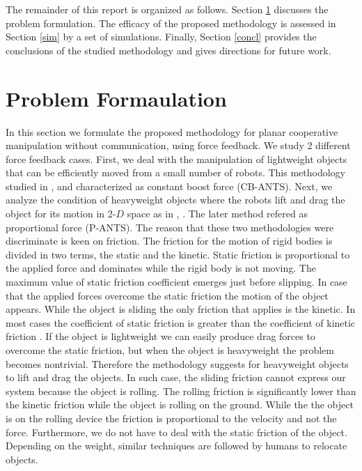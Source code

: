 \documentclass[letterpaper, 10 pt, conference]{ieeeconf}
\begin{document}
The remainder of this report is organized as follows. Section \ref{pf} discusses the problem formulation. The efficacy of the proposed methodology is assessed in Section \ref{sim} by a set of simulations. Finally, Section \ref{concl} provides the conclusions of the studied methodology and gives directions for future work.


\section{Problem Formaulation}\label{pf}
In this section we formulate the proposed methodology for planar cooperative manipulation without communication, using force feedback. We study 2 different force feedback cases. First, we deal with the manipulation of lightweight objects that can be efficiently moved from a small number of robots. This methodology studied in   \cite{wang2016force}, \cite{wang2016kinematic} and characterized as constant boost force (CB-ANTS). Next, we analyze the condition of heavyweight objects where the robots lift and drag the object for its motion in 2-$D$ space as in \cite{wang2015multi}, \cite{wang2016force}. The later method refered as proportional force (P-ANTS). The reason that these two methodologies were discriminate is keen on friction. The friction for the motion of rigid bodies is divided in two terms, the static and the kinetic. Static friction is proportional to the applied force and dominates while the rigid body is not moving. The maximum value of static friction coefficient emerges just before slipping. In case that the applied forces overcome the static friction the motion of the object appears. While the object is sliding the only friction that applies is the kinetic. In most cases the coefficient of static friction is greater than the coefficient of kinetic friction \cite{tipler2007physics}. If the object is lightweight we can easily produce drag forces to overcome the static friction, but when the object is heavyweight the problem becomes nontrivial. Therefore the methodology suggests for heavyweight objects to lift and drag the objects. In such case, the sliding friction cannot express our system because the object is rolling. The rolling friction is significantly lower than the  kinetic friction while the object is rolling on the ground. While the the object is on the rolling device the friction is proportional to the velocity and not the force. Furthermore, we do not have to deal with the static friction of the object. Depending on the weight, similar techniques are followed by humans to relocate objects. 
\end{document}
